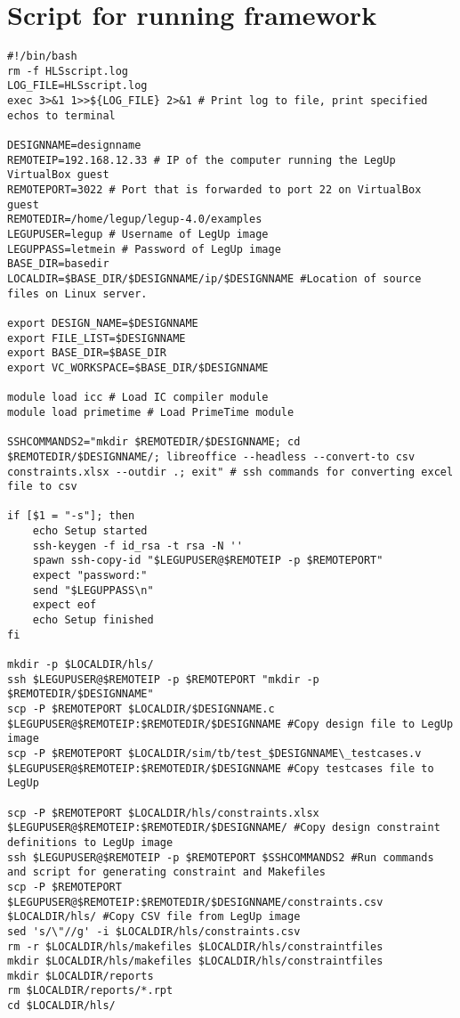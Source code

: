 \section{\label{sec:hlsscriptsourcecode}Script for running framework}
\lstset{language=[gnu] make, style=Cstyle}
\begin{lstlisting}[caption={HLS Script source code},label=lst:hlsscriptsourcecode]
#!/bin/bash
rm -f HLSscript.log
LOG_FILE=HLSscript.log
exec 3>&1 1>>${LOG_FILE} 2>&1 # Print log to file, print specified echos to terminal

DESIGNNAME=designname
REMOTEIP=192.168.12.33 # IP of the computer running the LegUp VirtualBox guest
REMOTEPORT=3022 # Port that is forwarded to port 22 on VirtualBox guest
REMOTEDIR=/home/legup/legup-4.0/examples
LEGUPUSER=legup # Username of LegUp image
LEGUPPASS=letmein # Password of LegUp image
BASE_DIR=basedir
LOCALDIR=$BASE_DIR/$DESIGNNAME/ip/$DESIGNNAME #Location of source files on Linux server.

export DESIGN_NAME=$DESIGNNAME
export FILE_LIST=$DESIGNNAME
export BASE_DIR=$BASE_DIR
export VC_WORKSPACE=$BASE_DIR/$DESIGNNAME

module load icc # Load IC compiler module
module load primetime # Load PrimeTime module

SSHCOMMANDS2="mkdir $REMOTEDIR/$DESIGNNAME; cd $REMOTEDIR/$DESIGNNAME/; libreoffice --headless --convert-to csv constraints.xlsx --outdir .; exit" # ssh commands for converting excel file to csv

if [$1 = "-s"]; then
	echo Setup started
	ssh-keygen -f id_rsa -t rsa -N ''
	spawn ssh-copy-id "$LEGUPUSER@$REMOTEIP -p $REMOTEPORT"
	expect "password:"
	send "$LEGUPPASS\n"
	expect eof
	echo Setup finished
fi

mkdir -p $LOCALDIR/hls/
ssh $LEGUPUSER@$REMOTEIP -p $REMOTEPORT "mkdir -p $REMOTEDIR/$DESIGNNAME"
scp -P $REMOTEPORT $LOCALDIR/$DESIGNNAME.c $LEGUPUSER@$REMOTEIP:$REMOTEDIR/$DESIGNNAME #Copy design file to LegUp image
scp -P $REMOTEPORT $LOCALDIR/sim/tb/test_$DESIGNNAME\_testcases.v $LEGUPUSER@$REMOTEIP:$REMOTEDIR/$DESIGNNAME #Copy testcases file to LegUp

scp -P $REMOTEPORT $LOCALDIR/hls/constraints.xlsx $LEGUPUSER@$REMOTEIP:$REMOTEDIR/$DESIGNNAME/ #Copy design constraint definitions to LegUp image
ssh $LEGUPUSER@$REMOTEIP -p $REMOTEPORT $SSHCOMMANDS2 #Run commands and script for generating constraint and Makefiles
scp -P $REMOTEPORT $LEGUPUSER@$REMOTEIP:$REMOTEDIR/$DESIGNNAME/constraints.csv $LOCALDIR/hls/ #Copy CSV file from LegUp image
sed 's/\"//g' -i $LOCALDIR/hls/constraints.csv
rm -r $LOCALDIR/hls/makefiles $LOCALDIR/hls/constraintfiles
mkdir $LOCALDIR/hls/makefiles $LOCALDIR/hls/constraintfiles
mkdir $LOCALDIR/reports
rm $LOCALDIR/reports/*.rpt
cd $LOCALDIR/hls/


\end{lstlisting}
